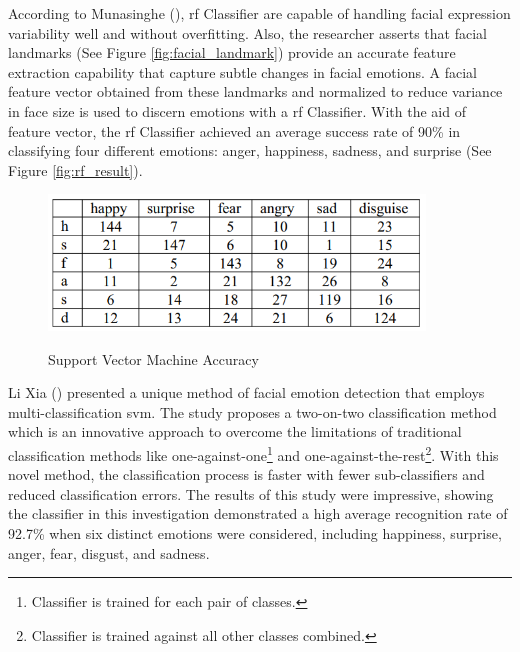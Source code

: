 \indent According to Munasinghe (\citeyear{munasinghe_2018_facial}), \gls{rf} Classifier are capable of handling facial expression variability well and without overfitting.
Also, the researcher asserts that facial landmarks (See Figure \ref{fig:facial_landmark}) provide an accurate feature extraction capability that capture subtle changes in facial emotions.
A facial feature vector obtained from these landmarks and normalized to reduce variance in face size is used to discern emotions with a \gls{rf} Classifier.
With the aid of feature vector, the \gls{rf} Classifier achieved an average success rate of 90\% in classifying four different emotions: anger, happiness, sadness, and surprise (See Figure \ref{fig:rf_result}).
\begin{figure}[H]
    \centering
    \includegraphics[width=10cm]{Images/svm_result.png}
    \caption{Support Vector Machine Accuracy} \footnotesize{\citep{xia_2014_facial}}
    \label{fig:svm_result}
\end{figure}
\indent Li Xia (\citeyear{xia_2014_facial}) presented a unique method of facial emotion detection that employs multi-classification \gls{svm}.
The study proposes a two-on-two classification method which is an innovative approach to overcome the limitations of traditional classification methods like one-against-one\footnote{Classifier is trained for each pair of classes.} and one-against-the-rest\footnote{Classifier is trained against all other classes combined.}.
With this novel method, the classification process is faster with fewer sub-classifiers and reduced classification errors.
The results of this study were impressive, showing the classifier in this investigation demonstrated a high average recognition rate of 92.7\% when six distinct emotions were considered, including happiness, surprise, anger, fear, disgust, and sadness. 
\\
